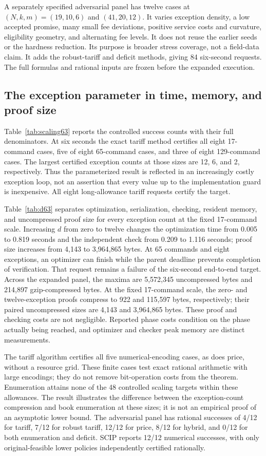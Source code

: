 \documentclass[11pt,letterpaper]{article}
\theoremstyle{definition}\newtheorem{remark}[theorem]{Remark}
\begin{document}
A separately specified adversarial panel has twelve cases at $(N,k,m)=(19,10,6)$ and $(41,20,12)$. It varies exception density, a low accepted promise, many small fee deviations, positive service costs and curvature, eligibility geometry, and alternating fee levels. It does not reuse the earlier seeds or the hardness reduction. Its purpose is broader stress coverage, not a field-data claim. It adds the robust-tariff and deficit methods, giving 84 six-second requests. The full formulas and rational inputs are frozen before the expanded execution.

\subsection{The exception parameter in time, memory, and proof size}
Table~\ref{tab:scaling63} reports the controlled success counts with their full denominators. At six seconds the exact tariff method certifies all eight 17-command cases, five of eight 65-command cases, and three of eight 129-command cases. The largest certified exception counts at those sizes are 12, 6, and 2, respectively. Thus the parameterized result is reflected in an increasingly costly exception loop, not an assertion that every value up to the implementation guard is inexpensive. All eight long-allowance tariff requests certify the target.

Table~\ref{tab:d63} separates optimization, serialization, checking, resident memory, and uncompressed proof size for every exception count at the fixed 17-command scale. Increasing $d$ from zero to twelve changes the optimization time from 0.005 to 0.819 seconds and the independent check from 0.209 to 1.116 seconds; proof size increases from 4,143 to 3,964,865 bytes. At 65 commands and eight exceptions, an optimizer can finish while the parent deadline prevents completion of verification. That request remains a failure of the six-second end-to-end target. Across the expanded panel, the maxima are 5,572,345 uncompressed bytes and 214,897 gzip-compressed bytes. At the fixed 17-command scale, the zero- and twelve-exception proofs compress to 922 and 115,597 bytes, respectively; their paired uncompressed sizes are 4,143 and 3,964,865 bytes. These proof and checking costs are not negligible. Reported phase costs condition on the phase actually being reached, and optimizer and checker peak memory are distinct measurements.

The tariff algorithm certifies all five numerical-encoding cases, as does price, without a resource grid. These finite cases test exact rational arithmetic with large encodings; they do not remove bit-operation costs from the theorem. Enumeration attains none of the 48 controlled scaling targets within these allowances. The result illustrates the difference between the exception-count compression and book enumeration at these sizes; it is not an empirical proof of an asymptotic lower bound. The adversarial panel has rational successes of 4/12 for tariff, 7/12 for robust tariff, 12/12 for price, 8/12 for hybrid, and 0/12 for both enumeration and deficit. SCIP reports 12/12 numerical successes, with only original-feasible lower policies independently certified rationally.
\end{document}
